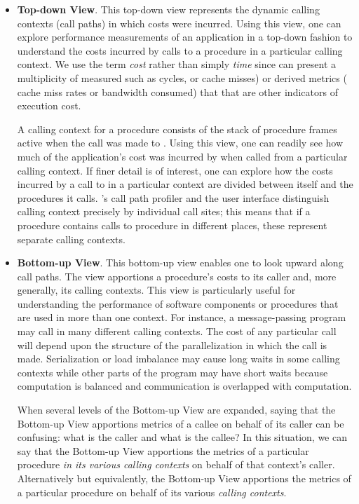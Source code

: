 \begin{itemize}
\item \textbf{Top-down View}.
  This top-down view represents the dynamic calling contexts (call paths) in which costs were incurred.
  Using this view, one can explore performance measurements of an application in a top-down fashion to understand the costs incurred by calls to a procedure in a particular calling context.
  We use the term \emph{cost} rather than simply \emph{time} since \hpcviewer{} can present a multiplicity of measured such as cycles, or cache misses) or derived metrics (\eg{} cache miss rates or bandwidth consumed) that that are other indicators of execution cost.

  A calling context for a procedure  consists of the stack of procedure frames active when the call was made to .
  Using this view, one can readily see how much of the application's cost was incurred by  when called from a particular calling context.
  If finer detail is of interest, one can explore how the costs incurred by a call to  in a particular context are divided between  itself and the procedures it calls.
  \HPCToolkit{}'s call path profiler \hpcrun{} and the \hpcviewer{} user interface distinguish calling context precisely by individual call sites; this means that if a procedure  contains calls to procedure  in different places, these represent separate calling contexts.

\item \textbf{Bottom-up View}.
  This bottom-up view enables one to look upward along call paths.
  The view apportions a procedure's costs to its caller and, more generally, its calling contexts.
  This view is particularly useful for understanding the performance of software components or procedures that are used in more than one context.
  For instance, a message-passing program may call  in many different calling contexts.
  The cost of any particular call will depend upon the structure of the parallelization in which the call is made.
  Serialization or load imbalance may cause long waits in some calling contexts while other parts of the program may have short waits because computation is balanced and communication is overlapped with computation.

  When several levels of the Bottom-up View are expanded, saying that the Bottom-up View apportions metrics of a callee on behalf of its caller can be confusing: what is the caller and what is the callee?
  In this situation, we can say that the Bottom-up View apportions the metrics of a particular procedure \emph{in its various calling contexts} on behalf of that context's caller.
  Alternatively but equivalently, the Bottom-up View apportions the metrics of a particular procedure on behalf of its various \emph{calling contexts}.


\end{itemize}
